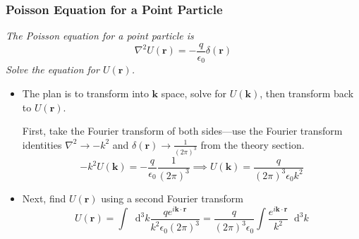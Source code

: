 \documentclass[11pt, a4paper]{article}
\newcommand{\diff}{\mathop{}\!\mathrm{d}} %
\renewcommand{\vec}[1]{\bm{#1}} %
\renewcommand{\r}{\vec{r}}
\newcommand{\ee}{\epsilon_{0}}  %
\begin{document}
\subsubsection{Poisson Equation for a Point Particle}
\textit{The Poisson equation for a point particle is}
\begin{equation*}
	\nabla^{2}U(\r) = - \frac{q}{\ee} \delta (\r)
\end{equation*}
\textit{Solve the equation for $ U(\r) $.}
\begin{itemize}
	
	\item The plan is to transform into $ \vec{k} $ space, solve for $ U(\vec{k}) $, then transform back to $ U(\r) $. 
	
	First, take the Fourier transform of both sides---use the Fourier transform identities $ \nabla^{2} \to -k^{2} $ and $ \delta(\r) \to \frac{1}{(2\pi)^{3}} $ from the theory section.
	\begin{equation*}
		- k^{2}U(\vec{k}) = - \frac{q}{\ee} \frac{1}{(2\pi)^{3}} \implies U(\vec{k}) = \frac{q}{(2\pi)^{3} \ee k^{2}}
	\end{equation*}
	
	\item Next, find $ U(\r) $ using a second Fourier transform
	\begin{equation*}
		U(\r) = \int \diff^{3} k \frac{q e^{i\vec{k}\cdot \r}}{k^{2}\ee(2\pi)^{3}} = \frac{q}{(2\pi)^{3}\ee} \int \frac{e^{i\vec{k}\cdot \r}}{k^{2}} \diff^{3}k
	\end{equation*}
	

\end{itemize}
\end{document}

